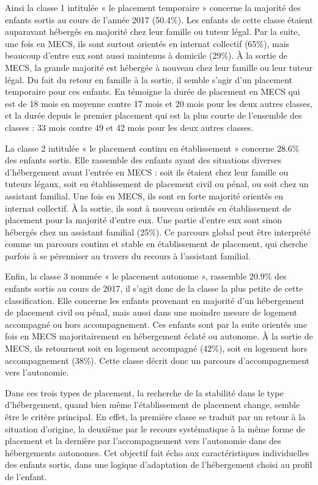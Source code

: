 \documentclass[
  12,
  a4paper,
]{report}
\begin{document}
Ainsi la classe 1 intitulée « le placement temporaire » concerne la
majorité des enfants sortis au cours de l'année 2017 (50.4\%). Les
enfants de cette classe étaient auparavant hébergés en majorité chez
leur famille ou tuteur légal. Par la suite, une fois en MECS, ils sont
surtout orientés en internat collectif (65\%), mais beaucoup d'entre eux
sont aussi maintenus à domicile (29\%). À la sortie de MECS, la grande
majorité est hébergée à nouveau chez leur famille ou leur tuteur légal.
Du fait du retour en famille à la sortie, il semble s'agir d'un
placement temporaire pour ces enfants. En témoigne la durée de placement
en MECS qui est de 18 mois en moyenne contre 17 mois et 20 mois pour les
deux autres classes, et la durée depuis le premier placement qui est la
plus courte de l'ensemble des classes : 33 mois contre 49 et 42 mois
pour les deux autres classes.

La classe 2 intitulée « le placement continu en établissement » concerne
28.6\% des enfants sortis. Elle rassemble des enfants ayant des
situations diverses d'hébergement avant l'entrée en MECS : soit ils
étaient chez leur famille ou tuteurs légaux, soit en établissement de
placement civil ou pénal, ou soit chez un assistant familial. Une fois
en MECS, ils sont en forte majorité orientés en internat collectif. À la
sortie, ils sont à nouveau orientés en établissement de placement pour
la majorité d'entre eux. Une partie d'entre eux sont sinon hébergés chez
un assistant familial (25\%). Ce parcours global peut être interprété
comme un parcours continu et stable en établissement de placement, qui
cherche parfois à se pérenniser au travers du recours à l'assistant
familial.

Enfin, la classe 3 nommée « le placement autonome », rassemble 20.9\%
des enfants sortis au cours de 2017, il s'agit donc de la classe la plus
petite de cette classification. Elle concerne les enfants provenant en
majorité d'un hébergement de placement civil ou pénal, mais aussi dans
une moindre mesure de logement accompagné ou hors accompagnement. Ces
enfants sont par la suite orientés une fois en MECS majoritairement en
hébergement éclaté ou autonome. À la sortie de MECS, ils retournent soit
en logement accompagné (42\%), soit en logement hors accompagnement
(38\%). Cette classe décrit donc un parcours d'accompagnement vers
l'autonomie.

Dans ces trois types de placement, la recherche de la stabilité dans le
type d'hébergement, quand bien même l'établissement de placement change,
semble être le critère principal. En effet, la première classe se
traduit par un retour à la situation d'origine, la deuxième par le
recours systématique à la même forme de placement et la dernière par
l'accompagnement vers l'autonomie dans des hébergements autonomes. Cet
objectif fait écho aux caractéristiques individuelles des enfants
sortis, dans une logique d'adaptation de l'hébergement choisi au profil
de l'enfant.
\end{document}
